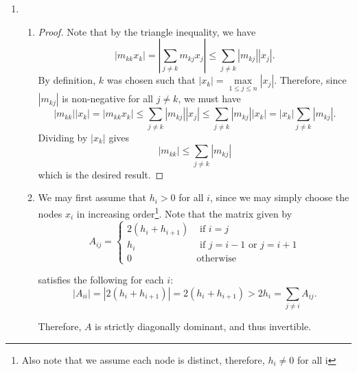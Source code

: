 \documentclass[12pt]{article}
\begin{document}
\begin{enumerate}[leftmargin=2em]
    \item
    \begin{enumerate}
        \item
        \begin{proof}
            Note that by the triangle inequality, we have
            \[|m_{kk}x_k|=\left| \sum_{j\neq k} m_{kj}x_{j}\right|\leq \sum_{j\neq k} |m_{kj}||x_j|.\]
            By definition, $k$ was chosen such that $|x_{k}|= \max\limits_{1\leq j\leq n} |x_j|$. Therefore, since $|m_{kj}|$ is non-negative for all $j\neq k$, we must have
            \[|m_{kk}||x_k|=|m_{kk}x_k|\leq \sum_{j\neq k} |m_{kj}||x_j| \leq \sum_{j\neq k} |m_{kj}||x_k|=|x_k|\sum_{j\neq k} |m_{kj}|.\]
            Dividing by $|x_k|$ gives
            \[|m_{kk}|\leq \sum_{j\neq k} |m_{kj}|\]
            which is the desired result.
        \end{proof}
        \item
        We may first assume that $h_i>0$ for all $i$, since we may simply choose the nodes $x_i$ in increasing order\footnote{Also note that we assume each node is distinct, therefore, $h_{i}\neq 0$ for all i}.
        Note that the matrix given by
        \[A_{ij}=\begin{cases}
            2(h_i+h_{i+1}) & \text{ if } i=j\\
            h_i & \text{ if } j = i-1 \text{ or } j= i+1\\
            0 & \text{otherwise}
        \end{cases}\]

        satisfies the following for each $i$:
        \[|A_{ii}|=|2(h_{i}+h_{i+1})|=2(h_{i}+h_{i+1})>2h_{i}=\sum_{j\neq i} A_{ij}.\]

        Therefore, $A$ is strictly diagonally dominant, and thus invertible. 

        \bigskip


\end{enumerate}
\end{enumerate}
\end{document}
